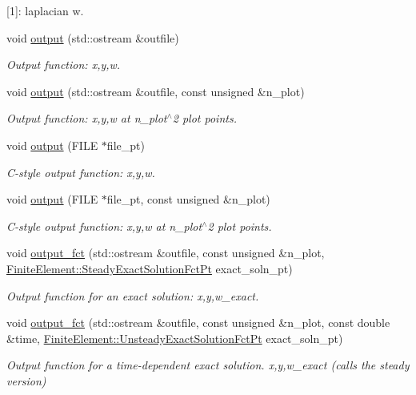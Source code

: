 \begin{DoxyCompactItemize}
\begin{DoxyCompactList}
\mbox{[}1\mbox{]}\+: laplacian w. \end{DoxyCompactList}\item 
void \hyperlink{classoomph_1_1TDisplacementBasedFoepplvonKarmanElement_a1c3ad1317dc48f704d6d012a9c50724e}{output} (std\+::ostream \&outfile)
\begin{DoxyCompactList}\small\item\em Output function\+: x,y,w. \end{DoxyCompactList}\item 
void \hyperlink{classoomph_1_1TDisplacementBasedFoepplvonKarmanElement_aa763fb490c43b132ea3322cad5f1662f}{output} (std\+::ostream \&outfile, const unsigned \&n\+\_\+plot)
\begin{DoxyCompactList}\small\item\em Output function\+: x,y,w at n\+\_\+plot$^\wedge$2 plot points. \end{DoxyCompactList}\item 
void \hyperlink{classoomph_1_1TDisplacementBasedFoepplvonKarmanElement_a5558c5bd6365deda6a93d6eae19f22d0}{output} (F\+I\+LE $\ast$file\+\_\+pt)
\begin{DoxyCompactList}\small\item\em C-\/style output function\+: x,y,w. \end{DoxyCompactList}\item 
void \hyperlink{classoomph_1_1TDisplacementBasedFoepplvonKarmanElement_a18dfb77359aae414020e12c4025534ab}{output} (F\+I\+LE $\ast$file\+\_\+pt, const unsigned \&n\+\_\+plot)
\begin{DoxyCompactList}\small\item\em C-\/style output function\+: x,y,w at n\+\_\+plot$^\wedge$2 plot points. \end{DoxyCompactList}\item 
void \hyperlink{classoomph_1_1TDisplacementBasedFoepplvonKarmanElement_a93812c3e443269fa8b272249bdce6b5e}{output\+\_\+fct} (std\+::ostream \&outfile, const unsigned \&n\+\_\+plot, \hyperlink{classoomph_1_1FiniteElement_a690fd33af26cc3e84f39bba6d5a85202}{Finite\+Element\+::\+Steady\+Exact\+Solution\+Fct\+Pt} exact\+\_\+soln\+\_\+pt)
\begin{DoxyCompactList}\small\item\em Output function for an exact solution\+: x,y,w\+\_\+exact. \end{DoxyCompactList}\item 
void \hyperlink{classoomph_1_1TDisplacementBasedFoepplvonKarmanElement_ade2f7fd74d6db0275a9e8bb255d7e495}{output\+\_\+fct} (std\+::ostream \&outfile, const unsigned \&n\+\_\+plot, const double \&time, \hyperlink{classoomph_1_1FiniteElement_ad4ecf2b61b158a4b4d351a60d23c633e}{Finite\+Element\+::\+Unsteady\+Exact\+Solution\+Fct\+Pt} exact\+\_\+soln\+\_\+pt)
\begin{DoxyCompactList}\small\item\em Output function for a time-\/dependent exact solution. x,y,w\+\_\+exact (calls the steady version) \end{DoxyCompactList}\end{DoxyCompactItemize}
